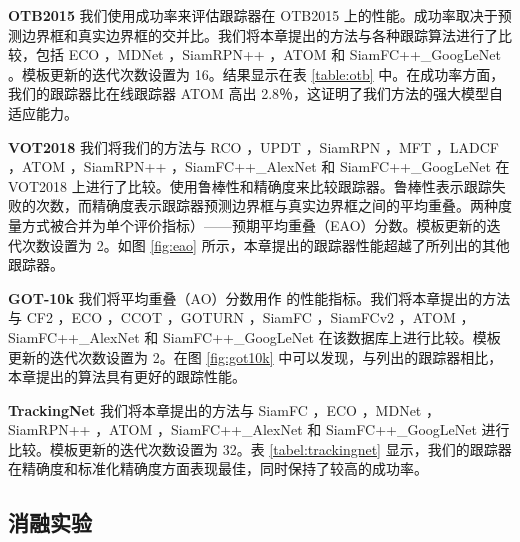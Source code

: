 \textbf{OTB2015} 我们使用成功率来评估跟踪器在 OTB2015 上的性能。成功率取决于预测边界框和真实边界框的交并比。我们将本章提出的方法与各种跟踪算法进行了比较，包括 ECO \cite{danelljan2017eco}，MDNet \cite{nam2016learning}，SiamRPN++ \cite{SiamRPN++}，ATOM \cite{danelljan2019atom} 和 SiamFC++\_GoogLeNet \cite{SiamFC++}。模板更新的迭代次数设置为 16。结果显示在表 \ref{table:otb} 中。在成功率方面，我们的跟踪器比在线跟踪器 ATOM 高出 2.8％，这证明了我们方法的强大模型自适应能力。

\textbf{VOT2018} 我们将我们的方法与 RCO \cite{kristan2018sixth}，UPDT \cite{bhat2018unveiling}，SiamRPN \cite{SiamRPN}，MFT \cite{kristan2018sixth}，LADCF \cite{kristan2018sixth}，ATOM \cite{danelljan2019atom}，SiamRPN++ \cite{SiamRPN++}，SiamFC++\_AlexNet \cite{SiamFC++} 和 SiamFC++\_GoogLeNet \cite{SiamFC++} 在 VOT2018 上进行了比较。使用鲁棒性和精确度来比较跟踪器。鲁棒性表示跟踪失败的次数，而精确度表示跟踪器预测边界框与真实边界框之间的平均重叠。两种度量方式被合并为单个评价指标）——预期平均重叠（EAO）分数。模板更新的迭代次数设置为 2。如图 \ref{fig:eao} 所示，本章提出的跟踪器性能超越了所列出的其他跟踪器。

\textbf{GOT-10k} 我们将平均重叠（AO）分数用作 \cite{GOT-10k} 的性能指标。我们将本章提出的方法与 CF2 \cite{CF2}，ECO \cite{danelljan2017eco}，CCOT \cite{CCOT}，GOTURN \cite{GOTURN}，SiamFC \cite{SiamFC}，SiamFCv2 \cite{valmadre2017end}，ATOM \cite{danelljan2019atom}，SiamFC++\_AlexNet \cite{SiamFC++} 和 SiamFC++\_GoogLeNet \cite{SiamFC++} 在该数据库上进行比较。模板更新的迭代次数设置为 2。在图 \ref{fig:got10k} 中可以发现，与列出的跟踪器相比，本章提出的算法具有更好的跟踪性能。

\textbf{TrackingNet} 我们将本章提出的方法与 SiamFC \cite{SiamFC}，ECO \cite{danelljan2017eco}，MDNet \cite{nam2016learning}，SiamRPN++ \cite{SiamRPN++}，ATOM \cite{danelljan2019atom}，SiamFC++\_AlexNet \cite{SiamFC++} 和 SiamFC++\_GoogLeNet \cite{SiamFC++} 进行比较。模板更新的迭代次数设置为 32。表 \ref{tabel:trackingnet} 显示，我们的跟踪器在精确度和标准化精确度方面表现最佳，同时保持了较高的成功率。

\subsection{消融实验}

